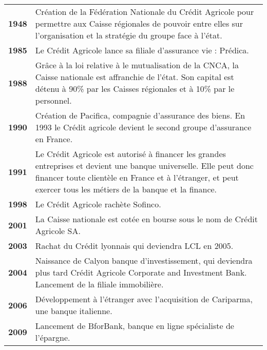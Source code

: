\documentclass[12pt,a4paper]{article}
\begin{document}
\begin{tabular}{lp{15.5cm}}
\textbf{1948} & Création de la Fédération Nationale du Crédit Agricole pour permettre aux Caisse régionales de pouvoir entre elles sur l'organisation et la stratégie du groupe face à l'état.\medskip \\
\textbf{1985} & Le Crédit Agricole lance sa filiale d'assurance vie : Prédica.\medskip \\
\textbf{1988} & Grâce à la loi relative à le mutualisation de la CNCA, la Caisse nationale est affranchie de l'état. Son capital est détenu à 90\% par les Caisses régionales et à 10\% par le personnel.\medskip \\
\textbf{1990} & Création de Pacifica, compagnie d'assurance des biens. En 1993 le Crédit agricole devient le second groupe d'assurance en France.\medskip \\
\textbf{1991} & Le Crédit Agricole est autorisé à financer les grandes entreprises et devient une banque universelle. Elle peut donc financer toute clientèle en France et à l'étranger, et peut exercer tous les métiers de la banque et la finance.\medskip \\
\textbf{1998} & Le Crédit Agricole rachète Sofinco.\medskip \\
\textbf{2001} & La Caisse nationale est cotée en bourse sous le nom de Crédit Agricole SA.\medskip \\
\textbf{2003} & Rachat du Crédit lyonnais qui deviendra LCL en 2005.\medskip \\
\textbf{2004} & Naissance de Calyon banque d'investissement, qui deviendra plus tard Crédit Agricole Corporate and Investment Bank. Lancement de la filiale immobilière.\medskip \\
\textbf{2006} & Développement à l'étranger avec l'acquisition de Cariparma, une banque italienne.\\
\textbf{2009} & Lancement de BforBank, banque en ligne spécialiste de l'épargne.\medskip \\
\end{tabular}\par

\newpage
\end{document}
